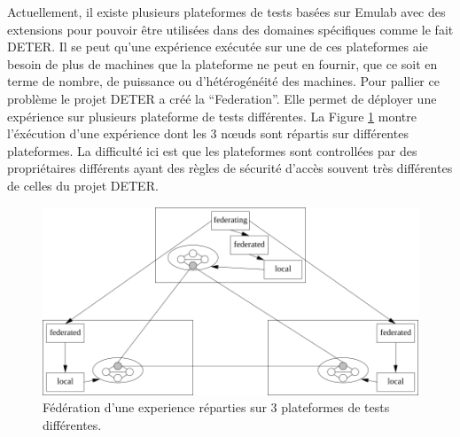 Actuellement, il existe plusieurs plateformes de tests basées sur
Emulab avec des extensions pour pouvoir être utilisées dans des
domaines spécifiques comme le fait DETER. Il se peut qu'une expérience
exécutée sur une de ces plateformes aie besoin de plus de machines que
la plateforme ne peut en fournir, que ce soit en terme de nombre, de
puissance ou d'hétérogénéité des machines. Pour pallier ce problème le
projet DETER a créé la
``Federation''\citep{DETER_faber2007deter}. Elle permet de déployer
une expérience sur plusieurs plateforme de tests différentes. La
Figure \ref{Federation} montre l'éxécution d'une expérience dont les 3
n\oe uds sont répartis sur différentes plateformes. La difficulté ici
est que les plateformes sont controllées par des propriétaires
différents ayant des règles de sécurité d'accès souvent très
différentes de celles du projet DETER.

\begin{figure}
  \centering \includegraphics[scale=0.75]{Pictures/png/Deter_federation}
  \caption{Fédération d'une experience réparties sur 3 plateformes de tests différentes.}
  \label{Federation}
\end{figure}

